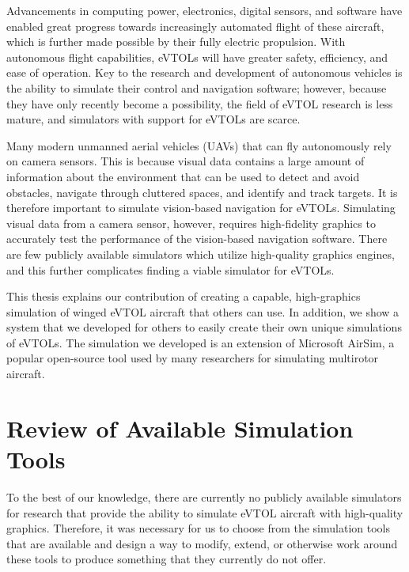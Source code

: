 Advancements in computing power, electronics, digital sensors, and software have enabled great progress towards increasingly automated flight of these aircraft, which is further made possible by their fully electric propulsion. With autonomous flight capabilities, eVTOLs will have greater safety, efficiency, and ease of operation. Key to the research and development of autonomous vehicles is the ability to simulate their control and navigation software; however, because they have only recently become a possibility, the field of eVTOL research is less mature, and simulators with support for eVTOLs are scarce.

Many modern unmanned aerial vehicles (UAVs) that can fly autonomously rely on camera sensors. This is because visual data contains a large amount of information about the environment that can be used to detect and avoid obstacles, navigate through cluttered spaces, and identify and track targets. It is therefore important to simulate vision-based navigation for eVTOLs. Simulating visual data from a camera sensor, however, requires high-fidelity graphics to accurately test the performance of the vision-based navigation software. There are few publicly available simulators which utilize high-quality graphics engines, and this further complicates finding a viable simulator for eVTOLs.



This thesis explains our contribution of creating a capable, high-graphics simulation of winged eVTOL aircraft that others can use. In addition, we show a system that we developed for others to easily create their own unique simulations of eVTOLs. The simulation we developed is an extension of Microsoft AirSim, a popular open-source tool used by many researchers for simulating multirotor aircraft.


\section{Review of Available Simulation Tools}
To the best of our knowledge, there are currently no publicly available simulators for research that provide the ability to simulate eVTOL aircraft with high-quality graphics. Therefore, it was necessary for us to choose from the simulation tools that are available and design a way to modify, extend, or otherwise work around these tools to produce something that they currently do not offer.

